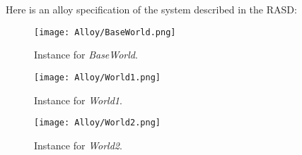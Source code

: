 Here is an alloy specification of the system described in the RASD: 
\vspace{2cm}

\newpage

\begin{figure}[H]
    \begin{center}
        \texttt{[image: Alloy/BaseWorld.png]}
        \caption{Instance for \textit{BaseWorld}.}
        \label{fig:baseWorld}%
    \end{center}
\end{figure}

\begin{figure}[H]
    \begin{center}
        \texttt{[image: Alloy/World1.png]}
        \caption{Instance for \textit{World1}.}
        \label{fig:baseWorld_magic}%
    \end{center}
\end{figure}


\begin{figure}[H]
    \begin{center}
        \texttt{[image: Alloy/World2.png]}
        \caption{Instance for \textit{World2}.}
        \label{fig:baseWorld_magic}%
    \end{center}
\end{figure}